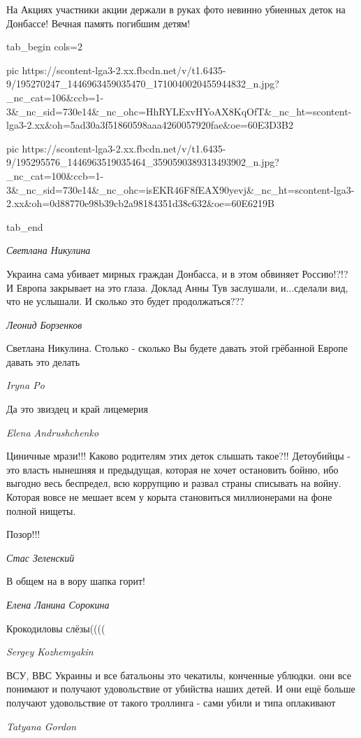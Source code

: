 На Акциях участники акции держали в руках фото невинно убиенных  деток на
Донбассе! Вечная память погибшим детям!


\ifcmt
  tab_begin cols=2

     pic https://scontent-lga3-2.xx.fbcdn.net/v/t1.6435-9/195270247_1446963459035470_1710040020455944832_n.jpg?_nc_cat=106&ccb=1-3&_nc_sid=730e14&_nc_ohc=HhRYLExvHYoAX8KqOfT&_nc_ht=scontent-lga3-2.xx&oh=5ad30a3f51860598aaa4260057920fae&oe=60E3D3B2

     pic https://scontent-lga3-2.xx.fbcdn.net/v/t1.6435-9/195295576_1446963519035464_3590590389313493902_n.jpg?_nc_cat=100&ccb=1-3&_nc_sid=730e14&_nc_ohc=isEKR46F8fEAX90yevj&_nc_ht=scontent-lga3-2.xx&oh=0d88770e98b39cb2a98184351d38c632&oe=60E6219B

  tab_end
\fi

\emph{Светлана Никулина}

Украина сама убивает мирных граждан Донбасса, и в этом обвиняет Россию!?!?
И Европа закрывает на это глаза.
Доклад Анны Тув заслушали, и...сделали вид, что не услышали.
И сколько это будет продолжаться???

\emph{Леонид Борзенков}

Светлана Никулина. Столько - сколько Вы будете давать этой грёбанной Европе давать это делать

\emph{Iryna Po}

Да это звиздец и край лицемерия

\emph{Elena Andrushchenko}

Циничные мрази!!! Каково родителям этих деток слышать такое?!! Детоубийцы - это
власть нынешняя и предыдущая, которая не хочет остановить бойню, ибо выгодно
весь беспредел, всю коррупцию и развал страны списывать на войну. Которая вовсе
не мешает всем у корыта становиться миллионерами на фоне полной нищеты.

Позор!!!

\emph{Стас Зеленский}

В общем на в вору шапка горит!

\emph{Елена Ланина Сорокина}

Крокодиловы слёзы((((

\emph{Sergey Kozhemyakin}

ВСУ, ВВС Украины и все батальоны это чекатилы, конченные ублюдки. они все
понимают и получают удовольствие от убийства наших детей. И они ещё больше
получают удовольствие от такого троллинга - сами убили и типа оплакивают

\emph{Tatyana Gordon}

